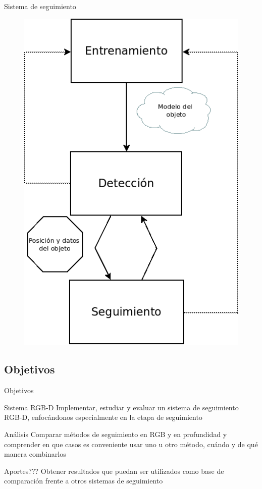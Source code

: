 \documentclass[]{beamer}
\begin{document}
\begin{frame}[t]{Sistema de seguimiento}
    \begin{figure}[t]
        \centering
        \vspace{-13pt}
        \includegraphics[scale=0.3]{img/esquema_seguimiento.png}
    \end{figure}
\end{frame}


\subsection{Objetivos}
\begin{frame}[t]{Objetivos}
    \begin{block}{Sistema RGB-D}
        Implementar, estudiar y evaluar un sistema de seguimiento RGB-D, enfocándonos especialmente en la etapa de seguimiento
    \end{block}
    \begin{block}{Análisis}
        Comparar métodos de seguimiento en RGB y en profundidad y comprender en que casos es conveniente usar uno u otro método, cuándo y de qué manera combinarlos
    \end{block}
    \begin{block}{Aportes???}
        Obtener resultados que puedan ser utilizados como base de comparación frente a otros sistemas de seguimiento
    \end{block}
\end{frame}
\end{document}
